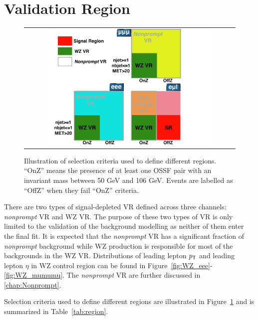 \section{Validation Region}
\label{sec:VR}

\begin{figure}[tbh!]
 \begin{center}
 \begin{tabular}{c}
 \includegraphics[width=0.8\textwidth]{figures/Part3/Selection/Event}
 \end{tabular}
 \caption{Illustration of selection criteria used to define different regions. ``OnZ'' means the presence of at least one \ac{OSSF} pair with an invariant mass between 50 GeV and 106 GeV. Events are labelled as ``OffZ'' when they fail ``OnZ'' criteria.}
 \label{fig:Event}
 \end{center}
\end{figure}

There are two types of signal-depleted \ac{VR} defined across three channels: \emph{nonprompt} \ac{VR} and WZ \ac{VR}. The purpose of these two types of \ac{VR} is only limited to the validation of the background modelling as neither of them enter the final fit. It is expected that the \emph{nonprompt} \ac{VR} has a significant fraction of \emph{nonprompt} background while WZ production is responsible for most of the backgrounds in the WZ \ac{VR}. Distributions of leading lepton $p_{\textsf{T}}$ and leading lepton $\eta$ in WZ control region can be found in Figure~\ref{fig:WZ_eee}-\ref{fig:WZ_mumumu}. The \emph{nonprompt} \ac{VR} are further discussed in \autoref{chap:Nonprompt}.

Selection criteria used to define different regions are illustrated in Figure~\ref{fig:Event} and is summarized in Table~\ref{tab:region}.

